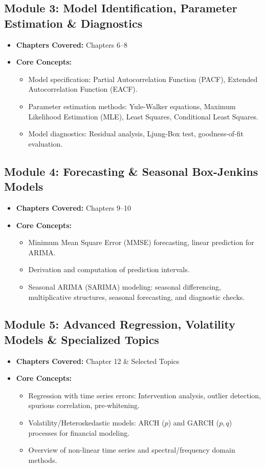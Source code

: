 \documentclass{article}
\begin{document}
\subsection*{Module 3: Model Identification, Parameter Estimation \& Diagnostics}
\begin{itemize}
    \item \textbf{Chapters Covered:} Chapters 6--8
    \item \textbf{Core Concepts:}
    \begin{itemize}
        \item Model specification: Partial Autocorrelation Function (PACF), Extended Autocorrelation Function (EACF).
        \item Parameter estimation methods: Yule-Walker equations, Maximum Likelihood Estimation (MLE), Least Squares, Conditional Least Squares.
        \item Model diagnostics: Residual analysis, Ljung-Box test, goodness-of-fit evaluation.
    \end{itemize}
\end{itemize}

\subsection*{Module 4: Forecasting \& Seasonal Box-Jenkins Models}
\begin{itemize}
    \item \textbf{Chapters Covered:} Chapters 9--10
    \item \textbf{Core Concepts:}
    \begin{itemize}
        \item Minimum Mean Square Error (MMSE) forecasting, linear prediction for ARIMA.
        \item Derivation and computation of prediction intervals.
        \item Seasonal ARIMA (SARIMA) modeling: seasonal differencing, multiplicative structures, seasonal forecasting, and diagnostic checks.
    \end{itemize}
\end{itemize}

\subsection*{Module 5: Advanced Regression, Volatility Models \& Specialized Topics}
\begin{itemize}
    \item \textbf{Chapters Covered:} Chapter 12 \& Selected Topics
    \item \textbf{Core Concepts:}
    \begin{itemize}
        \item Regression with time series errors: Intervention analysis, outlier detection, spurious correlation, pre-whitening.
        \item Volatility/Heteroskedastic models: ARCH ($p$) and GARCH ($p,q$) processes for financial modeling.
        \item Overview of non-linear time series and spectral/frequency domain methods.
    \end{itemize}
\end{itemize}
\end{document}
